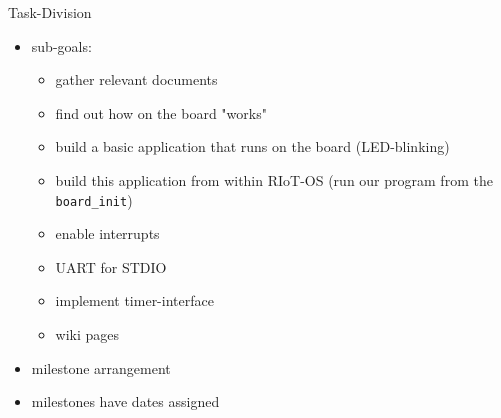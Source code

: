 \documentclass[9pt]{beamer}
\begin{document}
\begin{frame}{Task-Division}
 \begin{itemize}
 \item sub-goals:
 \begin{itemize}
 \item gather relevant documents
 \item find out how on the board "works"
 \item build a basic application that runs on the board (LED-blinking)
 \item build this application from within RIoT-OS (run our program from the \texttt{board\_init})
 \item enable interrupts
 \item UART for STDIO
 \item implement timer-interface
 \item wiki pages
 \end{itemize}
 \item milestone arrangement
 \item milestones have dates assigned
 \end{itemize}
\end{frame}
\end{document}
